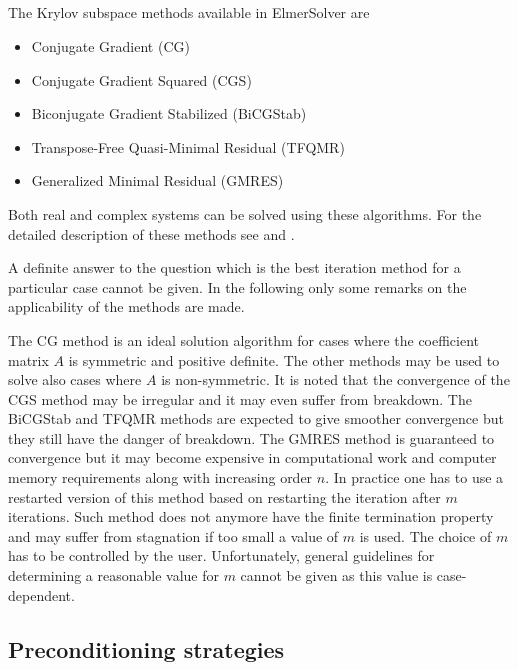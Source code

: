 \begin{versiona}
\subsection{}

The Krylov subspace methods available in ElmerSolver are
\begin{itemize}
\item Conjugate Gradient (CG)
\item Conjugate Gradient Squared (CGS) 
\item Biconjugate Gradient Stabilized (BiCGStab)
\item Transpose-Free Quasi-Minimal Residual (TFQMR)
\item Generalized Minimal Residual (GMRES)
\end{itemize}
Both real and complex systems can be solved using these algorithms. 
For the detailed description of these methods see \cite{Barrett93} 
and \cite{Freund93}.

A definite answer to the question which is the best iteration method for a particular
case cannot be given. 
In the following only some remarks on the applicability of the 
methods are made.
   
The CG method is an ideal solution algorithm for cases where the coefficient
matrix $A$ is symmetric and positive definite. The other methods may 
be used to solve also cases where $A$ is non-symmetric. It is noted that 
the convergence of the CGS method may be irregular and it may even suffer from breakdown. 
The BiCGStab and TFQMR methods are expected to give smoother convergence but they 
still have the danger of breakdown. The GMRES method is guaranteed to convergence
but it may become expensive in computational work and computer memory requirements
along with increasing order $n$.
In practice one has to use a restarted version of this method based on restarting 
the iteration after $m$ iterations. Such method does not anymore have the finite 
termination property and may suffer from stagnation
if too small a value of $m$ is used.
The choice of $m$ has to be controlled by the user. 
Unfortunately, general guidelines for determining a reasonable value for
$m$ cannot be given as this value is case-dependent.  


\subsection{Preconditioning strategies}


\end{versiona}
